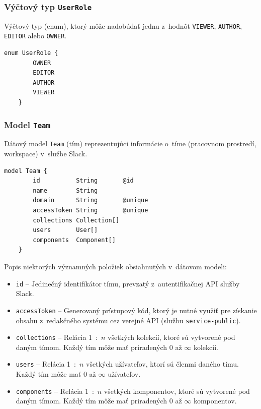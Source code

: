 \subsubsection{Výčtový typ \texttt{UserRole}}
Výčtový typ (enum), ktorý môže nadobúdať jednu z~hodnôt \texttt{VIEWER}, \texttt{AUTHOR}, \texttt{EDITOR} alebo \texttt{OWNER}. \\

\begin{lstlisting}[language={Prisma}, caption=Výčtový typ \texttt{UserRole} v~konfiguračnom súbore \texttt{prisma}.]
	enum UserRole {
		OWNER
		EDITOR
		AUTHOR
		VIEWER
	}
\end{lstlisting}

\subsubsection{Model \texttt{Team}}
Dátový model \texttt{Team} (tím) reprezentujúci informácie o~tíme (pracovnom prostredí, workspace) v~službe Slack. \\

\begin{lstlisting}[language={Prisma}, caption=Dátový model \texttt{Team} v~konfiguračnom súbore \texttt{prisma}.]
	model Team {
		id          String       @id
		name        String
		domain      String       @unique
		accessToken String       @unique
		collections Collection[]
		users       User[]
		components  Component[]
	}
\end{lstlisting}

\medskip

\noindent Popis niektorých významných položiek obsiahnutých v~dátovom modeli:

\begin{itemize}
	\item \texttt{id} -- Jedinečný identifikátor tímu, prevzatý z~autentifikačnej API služby Slack.
	\item \texttt{accessToken} -- Generovaný prístupový kód, ktorý je nutné využiť pre získanie obsahu z~redakčného systému cez verejné API (službu \texttt{service-public}). 
	\item \texttt{collections} -- Relácia 1~:~$n$ všetkých kolekcií, ktoré sú vytvorené pod daným tímom. Každý tím môže mať priradených 0 až $\infty$ kolekcií.
	\item \texttt{users} -- Relácia 1~:~$n$ všetkých užívateľov, ktorí sú členmi daného tímu. Každý tím môže mať 0 až $\infty$ užívateľov.
	\item \texttt{components} -- Relácia 1~:~$n$ všetkých komponentov, ktoré sú vytvorené pod daným tímom. Každý tím môže mať priradených 0 až $\infty$ komponentov.
\end{itemize}

